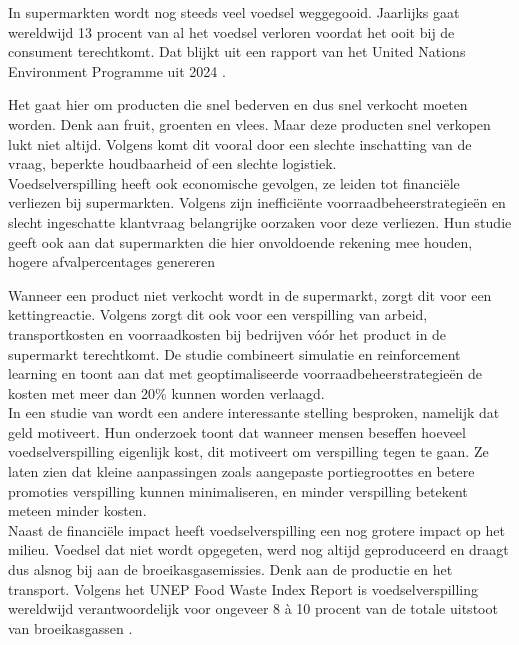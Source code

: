 \documentclass{hogent-article}
\begin{document}
    In supermarkten wordt nog steeds veel voedsel weggegooid. Jaarlijks gaat wereldwijd 13 procent van al het voedsel verloren voordat het ooit bij de consument terechtkomt. Dat blijkt uit een rapport van het United Nations Environment Programme uit 2024 \autocite{Programme202403}.
    
    Het gaat hier om producten die snel bederven en dus snel verkocht moeten worden. Denk aan fruit, groenten en vlees. Maar deze producten snel verkopen lukt niet altijd. Volgens \textcite{Teller2018a} komt dit vooral door een slechte inschatting van de vraag, beperkte houdbaarheid of een slechte logistiek.\\
    
    Voedselverspilling heeft ook economische gevolgen, ze leiden tot financiële verliezen bij supermarkten. Volgens \textcite{Teller2018a} zijn inefficiënte voorraadbeheerstrategieën en slecht ingeschatte klantvraag belangrijke oorzaken voor deze verliezen. Hun studie geeft ook aan dat supermarkten die hier onvoldoende rekening mee houden, hogere afvalpercentages genereren
    
    Wanneer een product niet verkocht wordt in de supermarkt, zorgt dit voor een kettingreactie. Volgens \textcite{Pilarski2024} zorgt dit ook voor een verspilling van arbeid, transportkosten en voorraadkosten bij bedrijven vóór het product in de supermarkt terechtkomt. De studie combineert simulatie en reinforcement learning en toont aan dat met geoptimaliseerde voorraadbeheerstrategieën de kosten met meer dan 20\% kunnen worden verlaagd.\\
    
    In een studie van \textcite{Visschers2017} wordt een andere interessante stelling besproken, namelijk dat geld motiveert. Hun onderzoek toont dat wanneer mensen beseffen hoeveel voedselverspilling eigenlijk kost, dit motiveert om verspilling tegen te gaan. Ze laten zien dat kleine aanpassingen zoals aangepaste portiegroottes en betere promoties verspilling kunnen minimaliseren, en minder verspilling betekent meteen minder kosten.\\
    
    Naast de financiële impact heeft voedselverspilling een nog grotere impact op het milieu. Voedsel dat niet wordt opgegeten, werd nog altijd geproduceerd en draagt dus alsnog bij aan de broeikasgasemissies. Denk aan de productie en het transport. Volgens het UNEP Food Waste Index Report is voedselverspilling wereldwijd verantwoordelijk voor ongeveer 8 à 10 procent van de totale uitstoot van broeikasgassen \autocite{Programme202403}.
    
\end{document}
